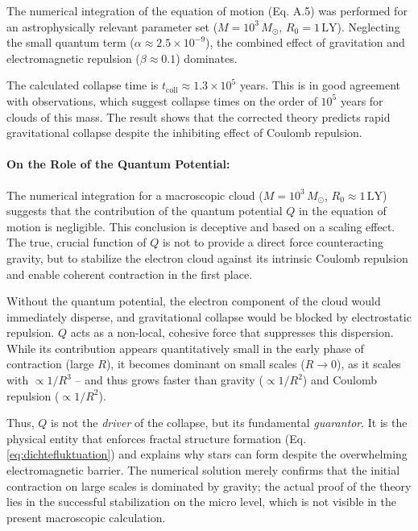 The numerical integration of the equation of motion (Eq. A.5) was performed for an astrophysically relevant parameter set ($M = 10^3 \, M_\odot$, $R_0 = 1 \, \text{LY}$). Neglecting the small quantum term ($\alpha \approx 2.5 \times 10^{-9}$), the combined effect of gravitation and electromagnetic repulsion ($\beta \approx 0.1$) dominates.

The calculated collapse time is $t_{\text{coll}} \approx 1.3 \times 10^5$ years. This is in good agreement with observations, which suggest collapse times on the order of $10^5$ years for clouds of this mass. The result shows that the corrected theory predicts rapid gravitational collapse despite the inhibiting effect of Coulomb repulsion.

\paragraph{On the Role of the Quantum Potential:} The numerical integration for a macroscopic cloud ($M = 10^3 \, M_\odot$, $R_0 \approx 1 \, \text{LY}$) suggests that the contribution of the quantum potential $Q$ in the equation of motion is negligible. This conclusion is deceptive and based on a scaling effect. The true, crucial function of $Q$ is not to provide a direct force counteracting gravity, but to stabilize the electron cloud against its intrinsic Coulomb repulsion and enable coherent contraction in the first place.

Without the quantum potential, the electron component of the cloud would immediately disperse, and gravitational collapse would be blocked by electrostatic repulsion. $Q$ acts as a non-local, cohesive force that suppresses this dispersion. While its contribution appears quantitatively small in the early phase of contraction (large $R$), it becomes dominant on small scales ($R \to 0$), as it scales with $\propto 1/R^3$ – and thus grows faster than gravity ($\propto 1/R^2$) and Coulomb repulsion ($\propto 1/R^2$).

Thus, $Q$ is not the \textit{driver} of the collapse, but its fundamental \textit{guarantor}. It is the physical entity that enforces fractal structure formation (Eq. \ref{eq:dichtefluktuation}) and explains why stars can form despite the overwhelming electromagnetic barrier. The numerical solution merely confirms that the initial contraction on large scales is dominated by gravity; the actual proof of the theory lies in the successful stabilization on the micro level, which is not visible in the present macroscopic calculation.

